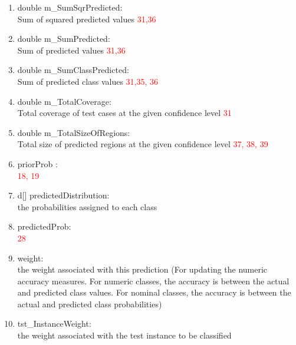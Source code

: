 \documentclass[a4paper,12pt]{article}
\begin{document}
\begin{enumerate}
  \item double m\_SumSqrPredicted: \\ Sum of squared predicted values \textcolor{red}{31,36} 
  
  \item double m\_SumPredicted: \\ Sum of predicted values  \textcolor{red}{31,36} 

  \item double m\_SumClassPredicted: \\ Sum of predicted class values \textcolor{red}{31,35, 36} 
  
  \item double m\_TotalCoverage: \\ Total coverage of test cases at the given confidence level \textcolor{red}{31} 
  
  \item double m\_TotalSizeOfRegions: \\ Total size of predicted regions at the given confidence level \textcolor{red}{37, 38, 39} 
  
  \item priorProb : \\  \textcolor{red}{18, 19} 
    
  
  \item d[] predictedDistribution: \\ the probabilities assigned to each class
  
  \item  predictedProb: \\  \textcolor{red}{28} 
  
  \item weight: \\   the weight associated with this prediction
  (For updating the numeric accuracy measures. For numeric classes, the accuracy is
   between the actual and predicted class values. For nominal classes, the
   accuracy is between the actual and predicted class probabilities)
  
  \item tst\_InstanceWeight: \\   the weight associated with the test instance to be classified 
  

\end{enumerate}
\end{document}
